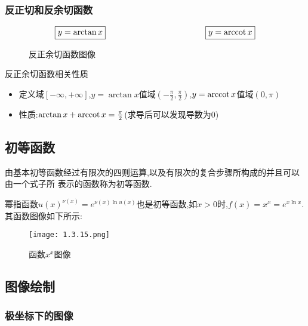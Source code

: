 \documentclass[12pt, a4paper, oneside, UTF8]{ctexbook}  %
\begin{document}
\begin{sloppypar}
    \subsubsection{反正切和反余切函数}
    $$
        \boxed{y=\arctan x}
        \qquad \qquad \qquad \qquad \qquad \qquad
        \boxed{y=\mathrm{arccot}\, x}
    $$
    \begin{figure}[H] \centering
        \caption{反正余切函数图像}
    \end{figure}
    \begin{criterion}{反正余切函数相关性质}{}
        \begin{itemize}
            \item 定义域$[-\infty,+\infty]$,$y=\arctan x$值域$(-\frac{\pi}{2},\frac{\pi}{2})$,$y=\mathrm{arccot}\, x$值域$(0,\pi)$
            \item 性质:$\arctan x+\mathrm{arccot}\, x=\frac{\pi}{2}$(求导后可以发现导数为0)
        \end{itemize}
    \end{criterion}
    \subsection{初等函数}
    由基本初等函数经过有限次的四则运算,以及有限次的复合步骤所构成的并且可以由一个式子所
    表示的函数称为初等函数.
    \begin{criterion}{}{}
        幂指函数$u(x)^{\nu(x)}=e^{\nu(x)\ln u(x)}$也是初等函数,如$x>0$时,$f(x)=x^x=e^{x\ln x}$.其函数图像如下所示:
        \begin{figure}[H]
            \centering \texttt{[image: 1.3.15.png]} \caption{函数$x^x$图像}
        \end{figure}
    \end{criterion}
    \subsection{图像绘制}

    \subsubsection{极坐标下的图像}


\end{sloppypar}
\end{document}
